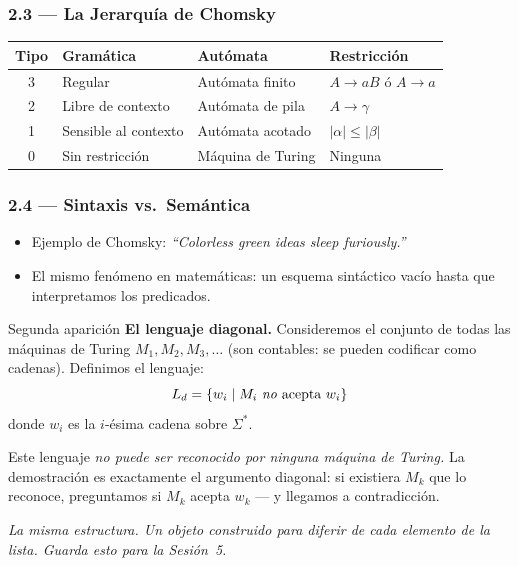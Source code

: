 \documentclass[11pt, letterpaper]{article}
\begin{document}
\subsubsection{2.3 --- La Jerarqu\'ia de Chomsky}
\begin{center}
\renewcommand{\arraystretch}{1.3}
\begin{tabular}{clll}
\toprule
\textbf{Tipo} & \textbf{Gram\'atica} & \textbf{Aut\'omata} & \textbf{Restricci\'on}\\
\midrule
3 & Regular           & Aut\'omata finito  & $A\to aB$ \'o $A\to a$ \\
2 & Libre de contexto & Aut\'omata de pila & $A\to\gamma$ \\
1 & Sensible al contexto & Aut\'omata acotado & $|\alpha|\leq|\beta|$ \\
0 & Sin restricci\'on & M\'aquina de Turing & Ninguna \\
\bottomrule
\end{tabular}
\end{center}

\subsubsection{2.4 --- Sintaxis vs.\ Sem\'antica}
\begin{itemize}
  \item Ejemplo de Chomsky: \textit{``Colorless green ideas sleep furiously.''}
  \item El mismo fen\'omeno en matem\'aticas: un esquema sint\'actico vac\'io hasta que interpretamos los predicados.
\end{itemize}

\begin{diagonal}{Segunda aparici\'on}
\textbf{El lenguaje diagonal.} Consideremos el conjunto de todas las m\'aquinas de Turing $M_1, M_2, M_3, \ldots$ (son contables: se pueden codificar como cadenas). Definimos el lenguaje:
\[L_d = \{w_i \mid M_i \text{ \emph{no} acepta } w_i\}\]
donde $w_i$ es la $i$-\'esima cadena sobre $\Sigma^*$.

Este lenguaje \emph{no puede ser reconocido por ninguna m\'aquina de Turing.} La demostraci\'on es exactamente el argumento diagonal: si existiera $M_k$ que lo reconoce, preguntamos si $M_k$ acepta $w_k$ --- y llegamos a contradicci\'on.

\medskip
\textit{La misma estructura. Un objeto construido para diferir de cada elemento de la lista. Guarda esto para la Sesi\'on~5.}
\end{diagonal}
\end{document}
